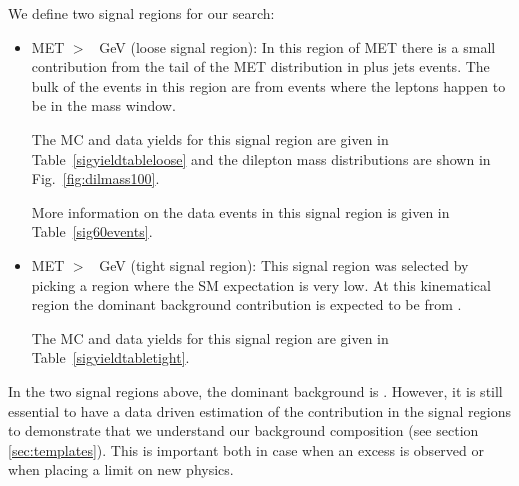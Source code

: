 We define two signal regions for our search:

\begin{itemize}
\item MET $>$ \signalmetl~GeV (loose signal region):
  In this region of MET there is a small contribution from the tail of the MET distribution 
  in \Z plus jets events. 
  The bulk of the events in this region are from \ttbar events where the leptons happen to be in the \Z 
  mass window.


  The MC and data yields for this signal region are given in Table~\ref{sigyieldtableloose} and the dilepton
  mass distributions are shown in Fig.~\ref{fig:dilmass100}.


  More information on the data events in this signal region is given in Table~\ref{sig60events}.

\item MET $>$ \signalmett~GeV (tight signal region):
  This signal region was selected by picking a region where the SM 
  expectation is very low.
  At this kinematical region the dominant background contribution is expected to be from \ttbar.

  The MC and data yields for this signal region are given in Table~\ref{sigyieldtabletight}.

\end{itemize}

In the two signal regions above, the dominant background is \ttbar. 
However, it is still essential to have a data driven estimation of the \Z contribution
in the signal regions to demonstrate that we understand our background composition (see section \ref{sec:templates}).
This is important both in case when an excess is observed or when placing a limit on new physics.

